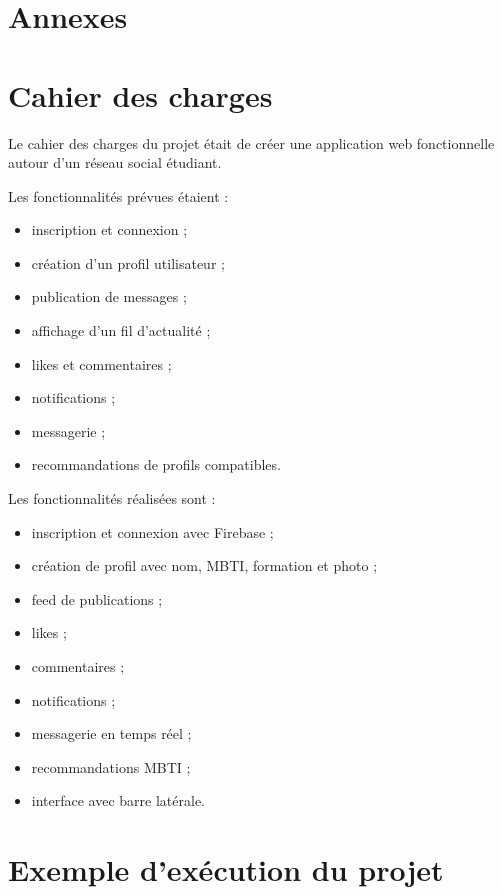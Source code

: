\documentclass[a4paper, 12pt, twoside]{article}
\begin{document}
\newpage

\section{Annexes}

\appendix

\makeatletter
\def\@seccntformat#1{Annexe~\csname the#1\endcsname:\quad}
\makeatother

\section{Cahier des charges}

Le cahier des charges du projet était de créer une application web fonctionnelle autour d'un réseau social étudiant.

Les fonctionnalités prévues étaient :

\begin{itemize}
    \item inscription et connexion ;
    \item création d'un profil utilisateur ;
    \item publication de messages ;
    \item affichage d'un fil d'actualité ;
    \item likes et commentaires ;
    \item notifications ;
    \item messagerie ;
    \item recommandations de profils compatibles.
\end{itemize}

Les fonctionnalités réalisées sont :

\begin{itemize}
    \item inscription et connexion avec Firebase ;
    \item création de profil avec nom, MBTI, formation et photo ;
    \item feed de publications ;
    \item likes ;
    \item commentaires ;
    \item notifications ;
    \item messagerie en temps réel ;
    \item recommandations MBTI ;
    \item interface avec barre latérale.
\end{itemize}

\section{Exemple d'exécution du projet}
\end{document}
